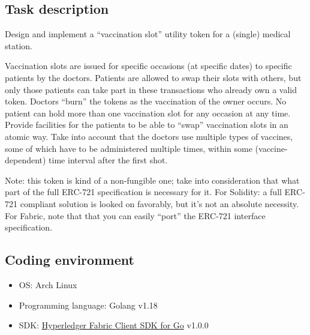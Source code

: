 \subsection{Task description}
Design and implement a “vaccination slot” utility token for a (single) medical station.\par
Vaccination slots are issued for specific occasions (at specific dates) to specific patients by the doctors. Patients are allowed to swap their slots with others, but only those patients can take part in these transactions who already own a valid token. Doctors “burn” the tokens as the vaccination of the owner occurs. No patient can hold more than one vaccination slot for any occasion at any time. Provide facilities for the patients to be able to “swap” vaccination slots in an atomic way. Take into account that the doctors use multiple types of vaccines, some of which have to be administered multiple times, within some (vaccine-dependent) time interval after the first shot.\par
Note: this token is kind of a non-fungible one; take into consideration that what part of the full ERC-721 specification is necessary for it. For Solidity: a full ERC-721 compliant solution is looked on favorably, but it's not an absolute necessity. For Fabric, note that that you can easily “port” the ERC-721 interface specification.

\subsection{Coding environment}
\begin{itemize}
  \item OS: Arch Linux
  \item Programming language: Golang v1.18
  \item SDK: \href{https://github.com/hyperledger/fabric-sdk-go}{Hyperledger Fabric Client SDK for Go} v1.0.0
\end{itemize}
